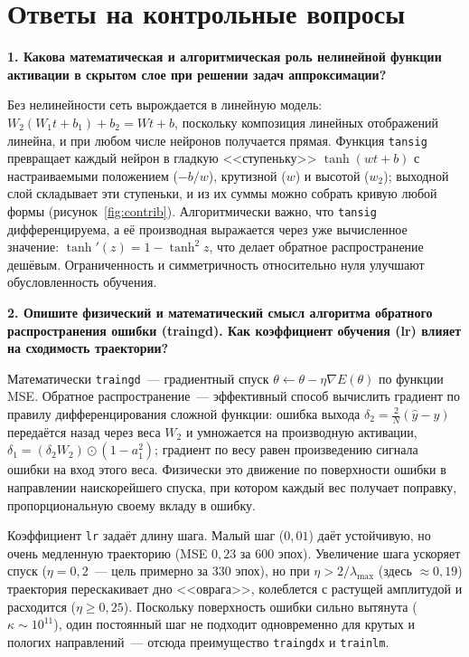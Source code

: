 \documentclass[14pt,a4paper]{extarticle}
\begin{document}
\section{Ответы на контрольные вопросы}

\textbf{1. Какова математическая и алгоритмическая роль нелинейной функции активации в скрытом слое при решении задач аппроксимации?}

Без нелинейности сеть вырождается в линейную модель: $W_2(W_1 t + b_1) + b_2 = W t + b$, поскольку композиция линейных отображений линейна, и при любом числе нейронов получается прямая. Функция \texttt{tansig} превращает каждый нейрон в гладкую <<ступеньку>> $\tanh(w t + b)$ с настраиваемыми положением ($-b/w$), крутизной ($w$) и высотой ($w_2$); выходной слой складывает эти ступеньки, и из их суммы можно собрать кривую любой формы (рисунок~\ref{fig:contrib}). Алгоритмически важно, что \texttt{tansig} дифференцируема, а её производная выражается через уже вычисленное значение: $\tanh'(z) = 1 - \tanh^2 z$, что делает обратное распространение дешёвым. Ограниченность и симметричность относительно нуля улучшают обусловленность обучения.

\textbf{2. Опишите физический и математический смысл алгоритма обратного распространения ошибки (traingd). Как коэффициент обучения (lr) влияет на сходимость траектории?}

Математически \texttt{traingd}~--- градиентный спуск $\theta \leftarrow \theta - \eta\nabla E(\theta)$ по функции MSE. Обратное распространение~--- эффективный способ вычислить градиент по правилу дифференцирования сложной функции: ошибка выхода $\delta_2 = \frac{2}{N}(\hat y - y)$ передаётся назад через веса $W_2$ и умножается на производную активации, $\delta_1 = (\delta_2 W_2)\odot(1 - a_1^2)$; градиент по весу равен произведению сигнала ошибки на вход этого веса. Физически это движение по поверхности ошибки в направлении наискорейшего спуска, при котором каждый вес получает поправку, пропорциональную своему вкладу в ошибку.

Коэффициент \texttt{lr} задаёт длину шага. Малый шаг ($0{,}01$) даёт устойчивую, но очень медленную траекторию (MSE $0{,}23$ за 600 эпох). Увеличение шага ускоряет спуск ($\eta = 0{,}2$~--- цель примерно за 330 эпох), но при $\eta > 2/\lambda_{\max}$ (здесь $\approx 0{,}19$) траектория перескакивает дно <<оврага>>, колеблется с растущей амплитудой и расходится ($\eta \ge 0{,}25$). Поскольку поверхность ошибки сильно вытянута ($\kappa \sim 10^{11}$), один постоянный шаг не подходит одновременно для крутых и пологих направлений~--- отсюда преимущество \texttt{traingdx} и \texttt{trainlm}.
\end{document}

